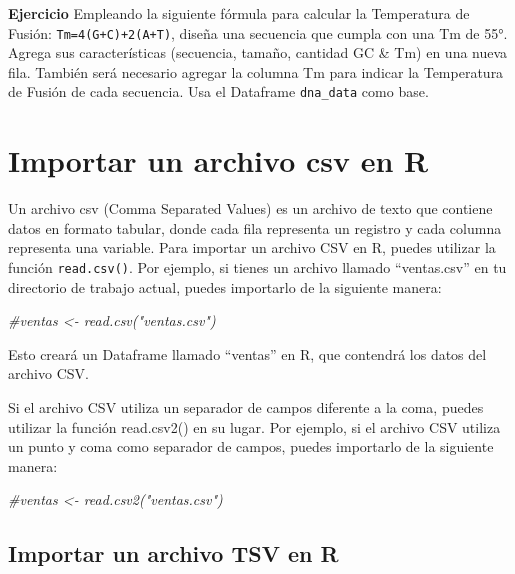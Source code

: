 \documentclass[
]{book}
\newenvironment{Shaded}{\begin{snugshade}}{\end{snugshade}}
\newcommand{\CommentTok}[1]{\textcolor[rgb]{0.56,0.35,0.01}{\textit{#1}}}
\begin{document}
\textbf{Ejercicio}
Empleando la siguiente fórmula para calcular la Temperatura de Fusión: \texttt{Tm=4(G+C)+2(A+T)}, diseña una secuencia que cumpla con una Tm de 55°. Agrega sus características (secuencia, tamaño, cantidad GC \& Tm) en una nueva fila. También será necesario agregar la columna Tm para indicar la Temperatura de Fusión de cada secuencia. Usa el Dataframe \texttt{dna\_data} como base.

\hypertarget{importar-un-archivo-csv-en-r}{%
\chapter{Importar un archivo csv en R}\label{importar-un-archivo-csv-en-r}}

Un archivo csv (Comma Separated Values) es un archivo de texto que contiene datos en formato tabular, donde cada fila representa un registro y cada columna representa una variable. Para importar un archivo CSV en R, puedes utilizar la función \texttt{read.csv()}. Por ejemplo, si tienes un archivo llamado ``ventas.csv'' en tu directorio de trabajo actual, puedes importarlo de la siguiente manera:

\begin{Shaded}
\begin{Highlighting}[]
\CommentTok{\#ventas \textless{}{-} read.csv("ventas.csv")}
\end{Highlighting}
\end{Shaded}

Esto creará un Dataframe llamado ``ventas'' en R, que contendrá los datos del archivo CSV.

Si el archivo CSV utiliza un separador de campos diferente a la coma, puedes utilizar la función read.csv2() en su lugar. Por ejemplo, si el archivo CSV utiliza un punto y coma como separador de campos, puedes importarlo de la siguiente manera:

\begin{Shaded}
\begin{Highlighting}[]
\CommentTok{\#ventas \textless{}{-} read.csv2("ventas.csv")}
\end{Highlighting}
\end{Shaded}

\hypertarget{importar-un-archivo-tsv-en-r}{%
\section{Importar un archivo TSV en R}\label{importar-un-archivo-tsv-en-r}}
\end{document}
